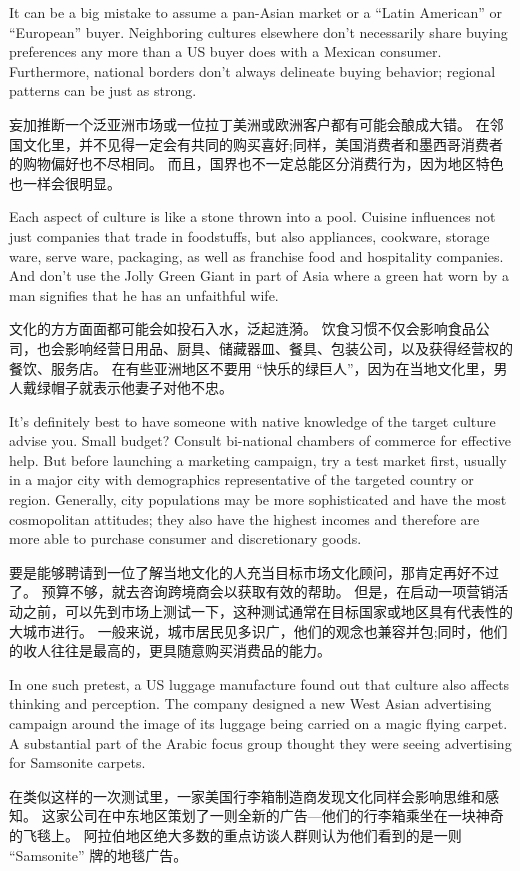 \documentclass[cs4size, a4paper, 12pt]{article}
\newcounter{numpar}
\newcommand*{\newpar}{\numpar{}}
\begin{document}
	\newpar It can be a big mistake to assume a pan-Asian market or a ``Latin American'' or ``European'' buyer. Neighboring cultures elsewhere don't necessarily share buying preferences any more than a US buyer does with a Mexican consumer. Furthermore, national borders don't always delineate buying behavior; regional patterns can be just as strong.
	
	妄加推断一个泛亚洲市场或一位拉丁美洲或欧洲客户都有可能会酿成大错。 在邻国文化里，并不见得一定会有共同的购买喜好;同样，美国消费者和墨西哥消费者的购物偏好也不尽相同。 而且，国界也不一定总能区分消费行为，因为地区特色也一样会很明显。  
	
	\newpar Each aspect of culture is like a stone thrown into a pool. Cuisine influences not just companies that trade in foodstuffs, but also appliances, cookware, storage ware, serve ware, packaging, as well as franchise food and hospitality companies. And don't use the Jolly Green Giant in part of Asia where a green hat worn by a man signifies that he has an unfaithful wife.
	
	文化的方方面面都可能会如投石入水，泛起涟漪。 饮食习惯不仅会影响食品公司，也会影响经营日用品、厨具、储藏器皿、餐具、包装公司，以及获得经营权的餐饮、服务店。 在有些亚洲地区不要用 ``快乐的绿巨人''，因为在当地文化里，男人戴绿帽子就表示他妻子对他不忠。  
	
	\newpar It's definitely best to have someone with native knowledge of the target culture advise you. Small budget? Consult bi-national chambers of commerce for effective help. But before launching a marketing campaign, try a test market first, usually in a major city with demographics representative of the targeted country or region. Generally, city populations may be more sophisticated and have the most cosmopolitan attitudes; they also have the highest incomes and therefore are more able to purchase consumer and discretionary goods.
	
	要是能够聘请到一位了解当地文化的人充当目标市场文化顾问，那肯定再好不过了。 预算不够，就去咨询跨境商会以获取有效的帮助。 但是，在启动一项营销活动之前，可以先到市场上测试一下，这种测试通常在目标国家或地区具有代表性的大城市进行。 一般来说，城市居民见多识广，他们的观念也兼容并包;同时，他们的收人往往是最高的，更具随意购买消费品的能力。  
	
	\newpar In one such pretest, a US luggage manufacture found out that culture also affects thinking and perception. The company designed a new West Asian advertising campaign around the image of its luggage being carried on a magic flying carpet.  A substantial part of the Arabic focus group thought they were seeing advertising for Samsonite carpets.
	
	在类似这样的一次测试里，一家美国行李箱制造商发现文化同样会影响思维和感知。 这家公司在中东地区策划了一则全新的广告—他们的行李箱乘坐在一块神奇的飞毯上。 阿拉伯地区绝大多数的重点访谈人群则认为他们看到的是一则 ``Samsonite'' 牌的地毯广告。 
	
	
\end{document}
